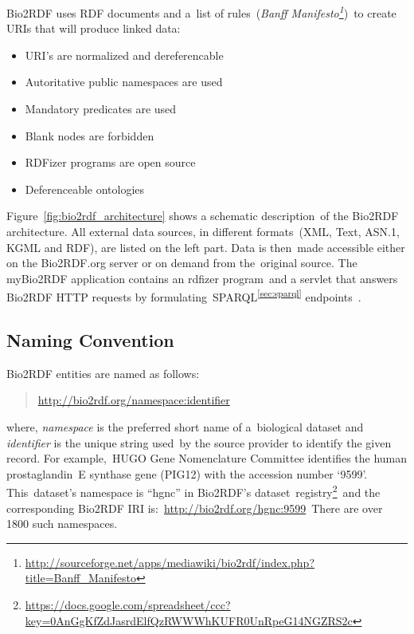 \documentclass[DIV=calc, paper=a4, fontsize=12pt, onecolumn]{scrartcl}	 %
\begin{document}
  \noindent Bio2RDF uses RDF documents and a\
  list of rules\
  (\emph{Banff Manifesto\footnote{\url{http://sourceforge.net/apps/mediawiki/bio2rdf/index.php?title=Banff_Manifesto}}})\
  to create URIs that will produce linked data:
  \begin{itemize}
    \itemindent3em
    \itemsep0ex
    \item [\textbf{Rule 1:}] URI's are normalized and dereferencable
    \item [\textbf{Rule 2:}] Autoritative public namespaces are used 
    \item [\textbf{Rule 3:}] Mandatory predicates are used
    \item [\textbf{Rule 4:}] Blank nodes are forbidden
    \item [\textbf{Rule 5:}] RDFizer programs are open source
    \item [\textbf{Rule 6:}] Deferenceable ontologies
  \end{itemize}
  Figure~\ref{fig:bio2rdf_architecture} shows a schematic description\
  of the Bio2RDF architecture. All external data sources, in different formats\
  (XML, Text, ASN.1, KGML and RDF), are listed on the left part. Data is then\
  made accessible either on the Bio2RDF.org server or on demand from the\
  original source. The myBio2RDF application contains an rdfizer program\
  and a servlet that answers Bio2RDF HTTP requests by formulating\
  SPARQL\textsuperscript{\ref{sec:sparql}} endpoints~\cite{callahan_bio2rdf_2013}.\\
  
  \subsection{Naming Convention}
  Bio2RDF entities are named as follows:
  \begin{quote}
    \url{http://bio2rdf.org/namespace:identifier}
  \end{quote}
  \noindent where, \emph{namespace} is the preferred short name of a\
  biological dataset and \emph{identifier} is the unique string used\
  by the source provider to identify the given record. For example,\
  HUGO Gene Nomenclature Committee identifies the human prostaglandin\
  E synthase gene (PIG12) with the accession number `9599'. This\
  dataset's namespace is ``hgnc'' in Bio2RDF's dataset\
  registry\footnote{\url{https://docs.google.com/spreadsheet/ccc?key=0AnGgKfZdJasrdElfQzRWWWhKUFR0UnRpeG14NGZRS2c}}\
  and the corresponding Bio2RDF IRI is:~\url{http://bio2rdf.org/hgnc:9599}\
  There are over 1800 such namespaces.
  
\end{document}
